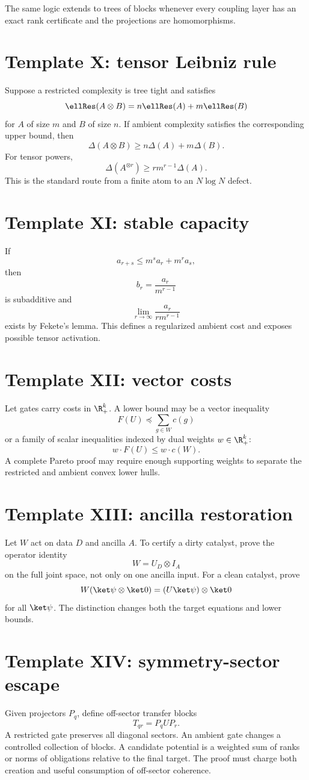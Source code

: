The same logic extends to trees of blocks whenever every coupling layer has an exact rank certificate and the projections are homomorphisms.

\section{Template X: tensor Leibniz rule}
Suppose a restricted complexity is tree tight and satisfies
\[
\ellRes(A\otimes B)
=n\ellRes(A)+m\ellRes(B)
\]
for $A$ of size $m$ and $B$ of size $n$.  If ambient complexity satisfies the corresponding upper bound, then
\[
\Delta(A\otimes B)
\ge
n\Delta(A)+m\Delta(B).
\]
For tensor powers,
\[
\Delta(A^{\otimes r})
\ge
r m^{r-1}\Delta(A).
\]
This is the standard route from a finite atom to an $N\log N$ defect.

\section{Template XI: stable capacity}
If
\[
a_{r+s}\le m^s a_r+m^r a_s,
\]
then
\[
b_r=\frac{a_r}{m^{r-1}}
\]
is subadditive and
\[
\lim_{r\to\infty}\frac{a_r}{r m^{r-1}}
\]
exists by Fekete's lemma.  This defines a regularized ambient cost and exposes possible tensor activation.

\section{Template XII: vector costs}
Let gates carry costs in $\R_+^k$.  A lower bound may be a vector inequality
\[
F(U)\preceq\sum_{g\in W}c(g)
\]
or a family of scalar inequalities indexed by dual weights $w\in\R_+^k$:
\[
w\cdot F(U)\le w\cdot c(W).
\]
A complete Pareto proof may require enough supporting weights to separate the restricted and ambient convex lower hulls.

\section{Template XIII: ancilla restoration}
Let $W$ act on data $D$ and ancilla $A$.  To certify a dirty catalyst, prove the operator identity
\[
W=U_D\otimes I_A
\]
on the full joint space, not only on one ancilla input.  For a clean catalyst, prove
\[
W(\ket\psi\otimes\ket0)
=(U\ket\psi)\otimes\ket0
\]
for all $\ket\psi$.  The distinction changes both the target equations and lower bounds.

\section{Template XIV: symmetry-sector escape}
Given projectors $P_q$, define off-sector transfer blocks
\[
T_{qr}=P_qUP_r.
\]
A restricted gate preserves all diagonal sectors.  An ambient gate changes a controlled collection of blocks.  A candidate potential is a weighted sum of ranks or norms of obligations relative to the final target.  The proof must charge both creation and useful consumption of off-sector coherence.

